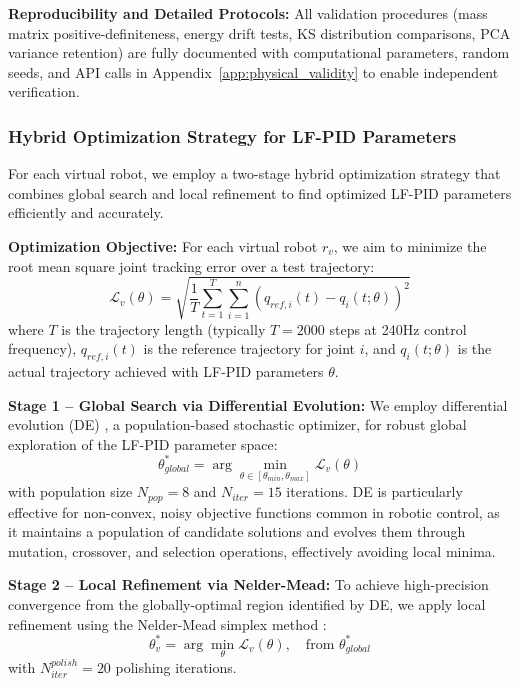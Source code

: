 \documentclass[a4paper]{cas-sc}
\begin{document}
\textbf{Reproducibility and Detailed Protocols:} All validation procedures (mass matrix positive-definiteness, energy drift tests, KS distribution comparisons, PCA variance retention) are fully documented with computational parameters, random seeds, and API calls in Appendix~\ref{app:physical_validity} to enable independent verification.

\subsubsection{Hybrid Optimization Strategy for LF-PID Parameters}

For each virtual robot, we employ a two-stage hybrid optimization strategy that combines global search and local refinement to find optimized LF-PID parameters efficiently and accurately.

\textbf{Optimization Objective:} For each virtual robot $r_v$, we aim to minimize the root mean square joint tracking error over a test trajectory:
\begin{equation}
    \mathcal{L}_v(\theta) = \sqrt{\frac{1}{T} \sum_{t=1}^{T} \sum_{i=1}^{n} \left( q_{ref,i}(t) - q_i(t; \theta) \right)^2}
\end{equation}
where $T$ is the trajectory length (typically $T=2000$ steps at 240Hz control frequency), $q_{ref,i}(t)$ is the reference trajectory for joint $i$, and $q_i(t; \theta)$ is the actual trajectory achieved with LF-PID parameters $\theta$.

\textbf{Stage 1 -- Global Search via Differential Evolution:} We employ differential evolution (DE) \cite{storn1997differential}, a population-based stochastic optimizer, for robust global exploration of the LF-PID parameter space:
\begin{equation}
    \theta^*_{global} = \arg\min_{\theta \in [\theta_{min}, \theta_{max}]} \mathcal{L}_v(\theta)
\end{equation}
with population size $N_{pop}=8$ and $N_{iter}=15$ iterations. DE is particularly effective for non-convex, noisy objective functions common in robotic control, as it maintains a population of candidate solutions and evolves them through mutation, crossover, and selection operations, effectively avoiding local minima.

\textbf{Stage 2 -- Local Refinement via Nelder-Mead:} To achieve high-precision convergence from the globally-optimal region identified by DE, we apply local refinement using the Nelder-Mead simplex method \cite{nelder1965simplex}:
\begin{equation}
    \theta^*_v = \arg\min_{\theta} \mathcal{L}_v(\theta), \quad \text{from } \theta^*_{global}
\end{equation}
with $N_{iter}^{polish}=20$ polishing iterations.
\end{document}
